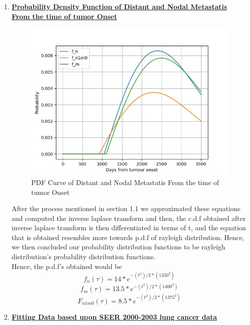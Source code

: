 \documentclass{article}
\begin{document}
	\begin{enumerate}
		
			\item \textbf{\underline{Probability Density Function of Distant and Nodal Metastatis From the time of tumor Onset }}
			\begin{figure}[htbp]
				\centerline{\includegraphics[scale=.35]{7.jpeg}}
				\caption{PDF Curve of  Distant and Nodal Metastatis From the time of tumor Onset }		
			\end{figure}
		
		After the process mentioned in section 1.1 we approximated these equations and computed the inverse laplace transform and then, the c.d.f obtained after inverse laplace transform is then differentiated in terms of t, and the equation that is obtained resembles more towards p.d.f of rayleigh distribution. Hence, we then concluded our probability distribution functions to be rayleigh distribution's probability distribution functions.\\
		
		Hence, the p.d.f's obtained would be \\
		$$f_n(\tau) =  14*e^ {-(t^2)/2*(1350^2)}$$
		$$f_m(\tau) = 13.5*e^{-(t^2)/2*(1400^2)} $$
		$$F_{n1m0}(\tau) =  8.5*e^ {-(t^2)/2*(1375^2)}$$
		
		\pagebreak
			
		\item \textbf{\underline{Fitting Data based upon SEER 2000-2003 lung cancer data}}
		

\end{enumerate}
\end{document}
